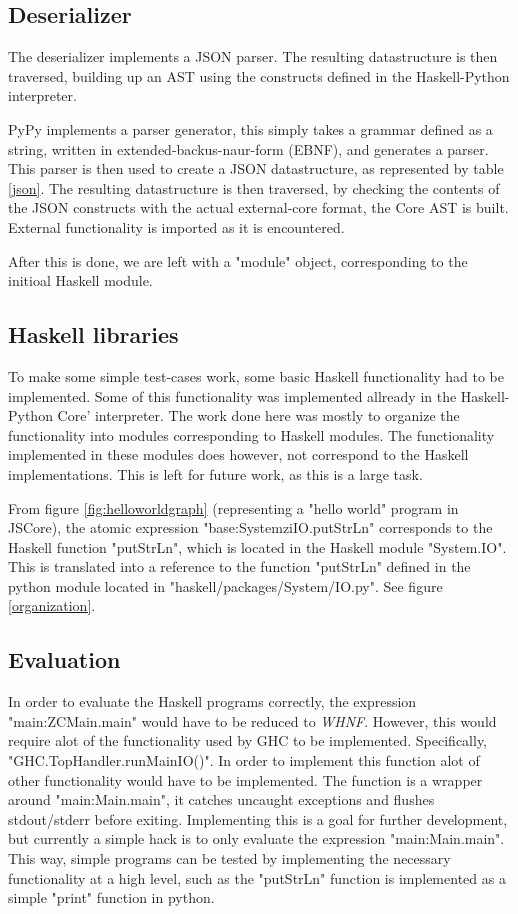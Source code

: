 \subsection{Deserializer}

The deserializer implements a JSON parser. The resulting datastructure is then traversed, building up
an AST using the constructs defined in the Haskell-Python interpreter. 

PyPy implements a parser generator, this simply takes a grammar defined as a string, written in
extended-backus-naur-form (EBNF), and generates a parser. This parser is then used to create a 
JSON datastructure, as represented by table \ref{json}.
The resulting datastructure is then traversed, by checking the contents of the JSON constructs
with the actual external-core format, the Core AST is built. External functionality is imported
as it is encountered. 

After this is done, we are left with a "module" object, corresponding to the initioal Haskell
module. 

\subsection{Haskell libraries}

To make some simple test-cases work, some basic Haskell functionality had to be implemented.
Some of this functionality was implemented allready in the Haskell-Python Core' interpreter.
The work done here was mostly to organize the functionality into modules corresponding
to Haskell modules. The functionality implemented in these modules does however, not correspond
to the Haskell implementations. This is left for future work, as this is a large task.

From figure \ref{fig:helloworldgraph} (representing a "hello world" program in JSCore), the atomic 
expression "base:SystemziIO.putStrLn" corresponds
to the Haskell function "putStrLn", which is located in the Haskell module "System.IO". This is translated
into a reference to the function "putStrLn" defined in the python module located in 
"haskell/packages/System/IO.py". See figure \ref{organization}.

\subsection{Evaluation}

In order to evaluate the Haskell programs correctly, the expression "main:ZCMain.main" would have
to be reduced to \emph{WHNF}. However, this would require alot of the functionality used by GHC
to be implemented. Specifically, "GHC.TopHandler.runMainIO()". In order to implement this function
alot of other functionality would have to be implemented. The function is a wrapper around 
"main:Main.main", it catches uncaught exceptions and flushes stdout/stderr before exiting. 
Implementing this is a goal for further
development, but currently a simple hack is to only evaluate the expression "main:Main.main". This way,
simple programs can be tested by implementing the necessary functionality at a high level, such as the
"putStrLn" function is implemented as a simple "print" function in python.

